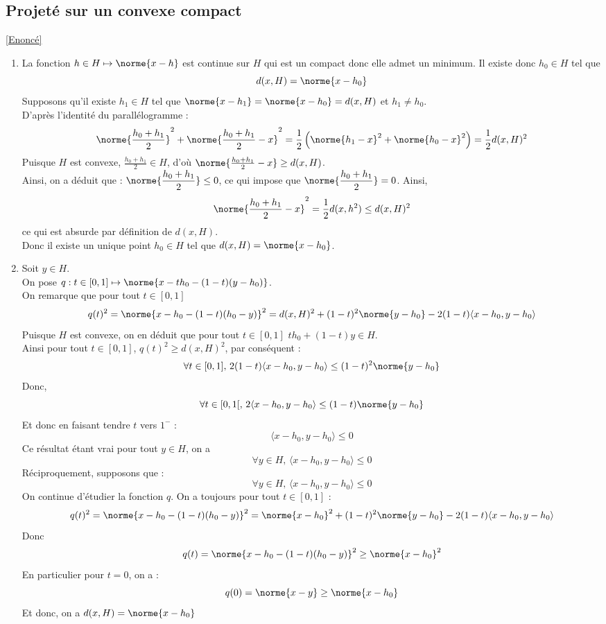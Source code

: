 \documentclass{book}
\begin{document}
	\subsection{Projeté sur un convexe compact }
	\label{sec:projete-sur-un-convexe-compact}
	\textcolor{blue}{\hyperref[Projeté convexe]{[Enoncé]}}\\
	\begin{enumerate}[leftmargin=*]
		\item La fonction $h\in H\mapsto \norme{x-h}$ est continue sur $H$ qui est un compact donc elle admet un minimum. Il existe donc $h_0\in H$ tel que \[d(x,H)=\norme{x-h_0}\]
		Supposons qu'il existe $h_1\in H$ tel que $\norme{x-h_1}=\norme{x-h_0}=d(x,H)$ et $h_1\ne h_0.$\\
		D'après l'identité du parallélogramme : 
		\[\norme{\frac{h_0+h_1}{2}}^2+\norme{\frac{h_0+h_1}{2}-x}^2=\frac{1}{2}\left(\norme{h_1-x}^2+\norme{h_0-x}^2\right)=\frac{1}{2}d(x,H)^2\]
		Puisque $H$ est convexe, $\frac{h_0+h_1}{2}\in H$, d'où $\norme{\frac{h_0+h_1}{2}-x}\geq d(x,H)$.\\
		Ainsi, on a déduit que : $\displaystyle\norme{\frac{h_0+h_1}{2}}\leq 0$, ce qui impose que $\displaystyle\norme{\frac{h_0+h_1}{2}}=0$.
		Ainsi, \[\norme{\frac{h_0+h_1}{2}-x}^2=\frac{1}{2}d(x,h^2)\leq d(x,H)^2\]
		ce qui est absurde par définition de $d(x,H)$.\\
		Donc il existe un unique point $h_0\in H$ tel que $d(x,H)=\norme{x-h_0}$.
		\item Soit $y\in H$.\\On pose $q:t\in[0,1]\mapsto \norme{x-th_0-(1-t)(y-h_0)}$.\\
		On remarque que pour tout $t\in[0,1]$ \[q(t)^2=\norme{x-h_0-(1-t)(h_0-y)}^2=d(x,H)^2+(1-t)^2\norme{y-h_0}-2(1-t)\langle x-h_0,y-h_0\rangle\]
		Puisque $H$ est convexe, on en déduit que pour tout $t\in[0,1]$ $th_0+(1-t)y\in H$.\\
		Ainsi pour tout $t\in[0,1]$, $q(t)^2\geq d(x,H)^2$, par conséquent : 
		\[\forall t\in[0,1], \, 2(1-t)\langle x-h_0,y-h_0\rangle\leq(1-t)^2\norme{y-h_0} \]
		Donc, \[\forall t\in[0,1[, \, 2\langle x-h_0,y-h_0\rangle\leq(1-t)\norme{y-h_0} \]
		Et donc en faisant tendre $t$ vers $1^-$ : \[\langle x-h_0,y-h_0\rangle\leq 0\]
		Ce résultat étant vrai pour tout $y\in H$, on a \[\forall y\in H, \, \langle x-h_0,y-h_0\rangle\leq 0\]
		Réciproquement, supposons que :
		\[\forall y\in H, \, \langle x-h_0,y-h_0\rangle\leq 0\]
		On continue d'étudier la fonction $q$.
		On a toujours pour tout $t\in[0,1]$ : \[q(t)^2=\norme{x-h_0-(1-t)(h_0-y)}^2=\norme{x-h_0}^2+(1-t)^2\norme{y-h_0}-2(1-t)\langle x-h_0,y-h_0\rangle\]
		Donc \[q(t)=\norme{x-h_0-(1-t)(h_0-y)}^2\geq \norme{x-h_0}^2\]
		En particulier pour $t=0$, on a : \[q(0)=\norme{x-y}\geq \norme{x-h_0}\]
		Et donc, on a $d(x,H)=\norme{x-h_0}$
	\end{enumerate}
	
\end{document}
